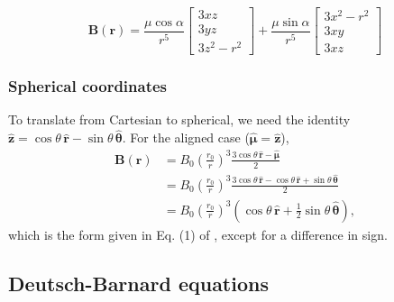 \documentclass{book}
\newcommand{\unitvec}[1]{\hat{\pmb{#1}}}
\begin{document}
\begin{equation}
    \pmb{B}(\pmb{r}) =
    \frac{\mu\cos\alpha}{r^5}\begin{bmatrix}
        3xz \\
        3yz \\
        3z^2 - r^2
    \end{bmatrix} + 
    \frac{\mu\sin\alpha}{r^5}\begin{bmatrix}
        3x^2 - r^2 \\
        3xy \\
        3xz
    \end{bmatrix}
\end{equation}

\subsubsection{Spherical coordinates}

To translate from Cartesian to spherical, we need the identity $\unitvec{z} = \cos\theta \,\unitvec{r} - \sin\theta\,\unitvec{\theta}$.
For the aligned case ($\unitvec{\mu} = \unitvec{z}$),
\begin{equation}
\begin{aligned}
    \pmb{B}(\pmb{r})
        &= B_0\left(\frac{r_0}{r}\right)^3\frac{3\cos\theta\,\unitvec{r} - \unitvec{\mu}}{2} \\
        &= B_0\left(\frac{r_0}{r}\right)^3\frac{3\cos\theta\,\unitvec{r} - \cos\theta \,\unitvec{r} + \sin\theta\,\unitvec{\theta}}{2} \\
        &= B_0\left(\frac{r_0}{r}\right)^3\left(\cos\theta\,\unitvec{r} + \frac12 \sin\theta\,\unitvec{\theta}\right),
\end{aligned}
\end{equation}
which is the form given in Eq. (1) of \citet{Davis1947}, except for a difference in sign.

\subsection{Deutsch-Barnard equations}
\end{document}
